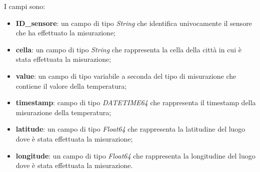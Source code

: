     I campi sono:
    \begin{itemize}
        \item \textbf{ID\_sensore}: un campo di tipo \textit{String} che identifica univocamente il sensore che ha effettuato la misurazione;
        \item \textbf{cella}: un campo di tipo \textit{String} che rappresenta la cella della città in cui è stata effettuata la misurazione;
        \item \textbf{value}: un campo di tipo variabile a seconda del tipo di misurazione che contiene il valore della temperatura;
        \item \textbf{timestamp}: campo di tipo \textit{DATETIME64} che rappresenta il timestamp della misurazione della temperatura;
        \item \textbf{latitude}: un campo di tipo \textit{Float64} che rappresenta la latitudine del luogo dove è stata effettuata la misurazione;
        \item \textbf{longitude}: un campo di tipo \textit{Float64} che rappresenta la longitudine del luogo dove è stata effettuata la misurazione.
    \end{itemize}

